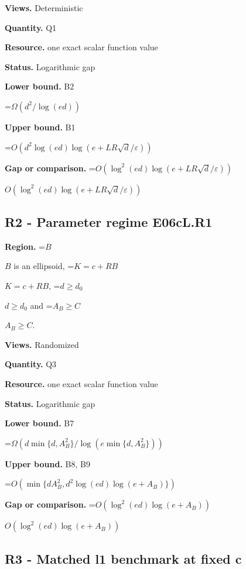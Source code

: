 \documentclass[10pt,a4paper]{article}
\newcommand{\AtlasMath}[1]{\par\begingroup\centering\setbox0=\hbox{$\displaystyle #1$}\ifdim\wd0>1.4\linewidth\typeout{ATLAS WIDE FORMULA: \the\wd0}\fi\ifdim\wd0>\linewidth\resizebox{\linewidth}{!}{\box0}\else\box0\fi\par\endgroup}
\newcommand{\AtlasInlineMath}[1]{\begingroup\setbox0=\hbox{$#1$}\ifdim\wd0>.4\linewidth\endgroup\AtlasMath{#1}\else\endgroup$#1$\fi}
\begin{document}
\textbf{Views.} Deterministic



\textbf{Quantity.} Q1



\textbf{Resource.} one exact scalar function value



\textbf{Status.} Logarithmic gap



\textbf{Lower bound.} B2



\AtlasMath{\Omega(d^2/\log(ed))}


\textbf{Upper bound.} B1



\AtlasMath{O(d^2\log(ed)\log(e+LR\sqrt d/\varepsilon))}


\textbf{Gap or comparison.} \AtlasInlineMath{O(\log^2(ed)\log(e+LR\sqrt d/\varepsilon))}



\subsection{R2 - Parameter regime E06cL.R1}


\textbf{Region.} \AtlasInlineMath{B} is an ellipsoid, \AtlasInlineMath{K=c+RB}, \AtlasInlineMath{d\ge d_0} and \AtlasInlineMath{A_B\ge C}.



\textbf{Views.} Randomized



\textbf{Quantity.} Q3



\textbf{Resource.} one exact scalar function value



\textbf{Status.} Logarithmic gap



\textbf{Lower bound.} B7



\AtlasMath{\Omega(d\min\{d,A_B^2\}/\log(e\min\{d,A_B^2\}))}


\textbf{Upper bound.} B8, B9



\AtlasMath{O(\min\{dA_B^2,d^2\log(ed)\log(e+A_B)\})}


\textbf{Gap or comparison.} \AtlasInlineMath{O(\log^2(ed)\log(e+A_B))}



\subsection{R3 - Matched l1 benchmark at fixed c}
\end{document}
